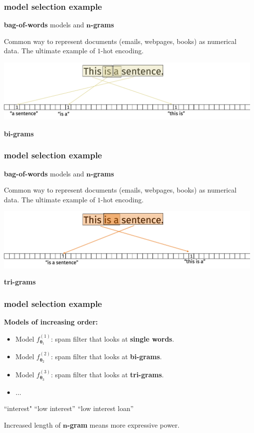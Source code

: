 \documentclass[handout,compress]{beamer}
\newcommand{\bs}[1]{\boldsymbol{#1}}
\newcommand{\bv}[1]{\mathbf{#1}}
\begin{document}
\begin{frame}
	\frametitle{model selection example}
	\begin{center}
		\textbf{bag-of-words} models and \textbf{$\bv{n}$-grams}
	\end{center}
	Common way to represent documents (emails, webpages, books) as numerical data. The ultimate example of $1$-hot encoding.
	\begin{center}
		\includegraphics[width=\textwidth]{bigrams.png}
		
		\alert{\Large \textbf{bi-grams}}
	\end{center}
\end{frame}

\begin{frame}
	\frametitle{model selection example}
	\begin{center}
		\textbf{bag-of-words} models and \textbf{$\bv{n}$-grams}
	\end{center}
	Common way to represent documents (emails, webpages, books) as numerical data. The ultimate example of $1$-hot encoding.
	\begin{center}
		\includegraphics[width=\textwidth]{trigrams.png}
		
		\alert{\Large \textbf{tri-grams}}
	\end{center}
\end{frame}

\begin{frame}
	\frametitle{model selection example}
	\textbf{Models of increasing order:}
	\begin{itemize}
		\item Model $f_{\bs{\theta}_1}^{(1)}$: spam filter that looks at \textbf{single words}. 
		\item Model $f_{\bs{\theta}_2}^{(2)}$: spam filter that looks at \textbf{bi-grams}.
		\item Model $f_{\bs{\theta}_3}^{(3)}$: spam filter that looks at \textbf{tri-grams}.
		\item $\ldots$
	\end{itemize}
	\begin{center}
		``interest" \hspace{3em} ``low interest'' \hspace{3em}``low interest loan'' 
	\end{center}

	Increased length of \textbf{$\bv{n}$-gram} means more expressive power. 
\end{frame}
\end{document}
